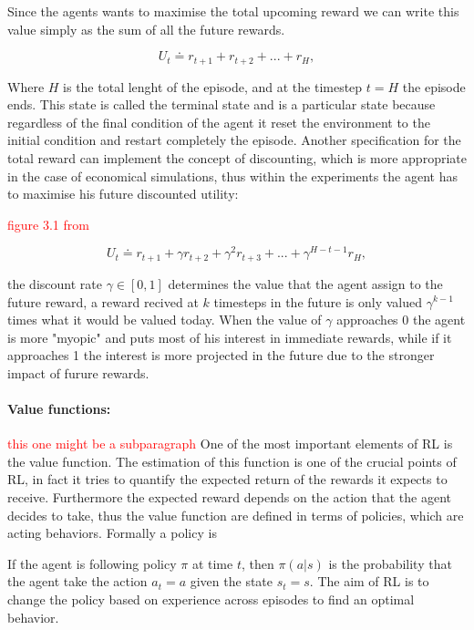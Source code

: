 Since the agents wants to maximise the total upcoming reward we can write this value simply as the sum of all the future rewards.

\begin{equation*}
U_t \doteq r_{t+1} + r_{t+2} + ... + r_{H},
\end{equation*}

Where \( H \) is the total lenght of the episode, and at the timestep \( t = H \) the episode ends. This state is called the terminal state and is a particular state because regardless of the final condition of the agent it reset the environment to the initial condition and restart completely the episode.
Another specification for the total reward can implement the concept of discounting, which is more appropriate in the case of economical simulations, thus within the experiments the agent has to maximise his future discounted utility:


\textcolor{red}{figure 3.1 from \cite{sutton2018reinforcement}}

\begin{equation}
U_t \doteq r_{t+1} + \gamma r_{t+2} + \gamma^2 r_{t+3} +... + \gamma^{H-t-1}r_{H},
\end{equation}

the discount rate \( \gamma \in [0,1] \) determines the value that the agent assign to the future reward, a reward recived at \( k \) timesteps in the future is only valued \(\gamma^{k-1} \) times what it would be valued today. When the value of \( \gamma \) approaches 0 the agent is more "myopic" and puts most of his interest in immediate rewards, while if it approaches 1 the interest is more projected in the future due to the stronger impact of furure rewards.


\paragraph{Value functions: } \textcolor{red}{this one might be a subparagraph} One of the most important elements of RL is the value function. The estimation of this function is one of the crucial points of RL, in fact it tries to quantify the expected return of the rewards it expects to receive. Furthermore the expected reward depends on the action that the agent decides to take, thus the value function are defined in terms of policies, which are acting behaviors.
Formally a policy is 

If the agent is following policy \( \pi \) at time \( t \), then \( \pi(a|s) \) is the probability that the agent take the action \( a_t = a \) given the state \( s_t = s \). The aim of RL is to change the policy based on experience across episodes to find an optimal behavior.

